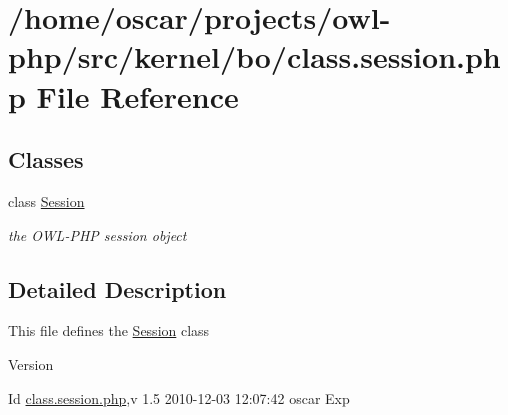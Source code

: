 \section{/home/oscar/projects/owl-\/php/src/kernel/bo/class.session.php File Reference}
\label{class_8session_8php}
\subsection*{Classes}
\begin{DoxyCompactItemize}
\item 
class \hyperlink{classSession}{Session}
\begin{DoxyCompactList}\small\item\em the OWL-\/PHP session object \item\end{DoxyCompactList}\end{DoxyCompactItemize}


\subsection{Detailed Description}
This file defines the \hyperlink{classSession}{Session} class \begin{DoxyVersion}{Version}

\end{DoxyVersion}
\begin{DoxyParagraph}{Id}
\hyperlink{class_8session_8php}{class.session.php},v 1.5 2010-\/12-\/03 12:07:42 oscar Exp 
\end{DoxyParagraph}
